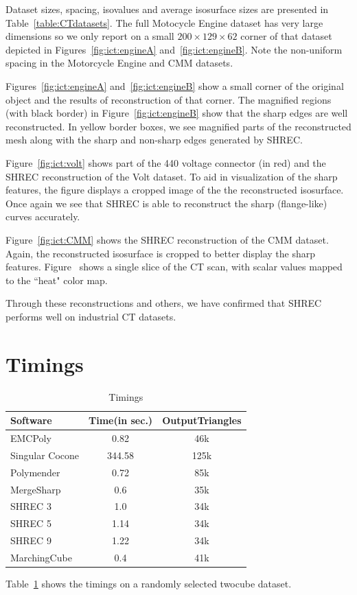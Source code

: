 Dataset sizes, spacing, isovalues and average isosurface sizes are presented
in Table~\ref{table:CTdatasets}.
The full Motocycle Engine dataset has very large dimensions
so we only report on a small $200 \times 129 \times 62$ corner 
of that dataset depicted in Figures~\ref{fig:ict:engineA} 
and~\ref{fig:ict:engineB}.
Note the non-uniform spacing in the Motorcycle Engine and CMM datasets.

Figures~\ref{fig:ict:engineA} and~\ref{fig:ict:engineB} 
show a small corner of the original object
and the results of reconstruction of that corner.
The magnified regions (with black border) in Figure~\ref{fig:ict:engineB}
show that the sharp edges are well reconstructed. 
In yellow border boxes, we see magnified parts
of the reconstructed mesh along with the sharp and non-sharp edges
generated by SHREC.

Figure~\ref{fig:ict:volt} shows part of the 440 voltage connector (in red)
and the SHREC reconstruction of the Volt dataset.
To aid in visualization of the sharp features,
the figure displays a cropped image of the the reconstructed isosurface.
Once again we see that SHREC is able to reconstruct 
the sharp (flange-like) curves accurately.

Figure~\ref{fig:ict:CMM} shows the SHREC reconstruction of the CMM dataset.
Again, the reconstructed isosurface is cropped to better
display the sharp features.
Figure~\protect{} shows a single slice of
the CT scan, with scalar values mapped to the ``heat" color map.

Through these reconstructions and others,
we have confirmed that SHREC performs well on industrial CT datasets. 

\section{Timings}
\begin{table}[]
	\centering
	\begin{tabular}{|l| c|c|}\hline
		Software & Time(in sec.) & OutputTriangles \\ \hline
		EMCPoly & 0.82 &  46k  \\
		Singular Cocone & 344.58  &  125k\\
		Polymender&  0.72&  85k\\
		MergeSharp&  0.6&  35k \\
		SHREC 3&  1.0&  34k \\
		SHREC 5&  1.14&   34k \\
		SHREC 9&  1.22&   34k\\
		MarchingCube& 0.4  &  41k \\ \hline
	\end{tabular}
		\caption{Timings}
		\label{table:timings}

\end{table}
Table~\ref{table:timings} shows the timings on a randomly selected twocube dataset.